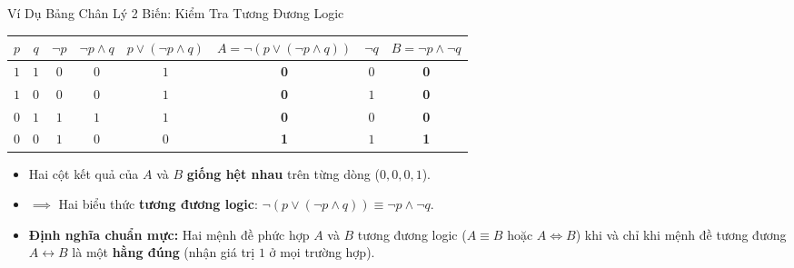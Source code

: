 \documentclass[aspectratio=169, 10pt]{beamer}
\begin{document}
\begin{frame}{Ví Dụ Bảng Chân Lý 2 Biến: Kiểm Tra Tương Đương Logic}
  \begin{cozyExample}[Bài toán: Kiểm tra hai biểu thức $A = \neg(p \lor (\neg p \land q))$ và $B = \neg p \land \neg q$ có tương đương không?]
    \centering
    \renewcommand{\arraystretch}{1.05}
    \footnotesize
    \begin{tabular}{cc|cccc|cc}
      \toprule
      $p$ & $q$ & $\neg p$ & $\neg p \land q$ & $p \lor (\neg p \land q)$ & $A = \neg(p \lor (\neg p \land q))$ & $\neg q$ & $B = \neg p \land \neg q$ \\
      \midrule
      $1$ & $1$ & $0$ & $0$ & $1$ & \textbf{\textcolor{cozyFalse}{0}} & $0$ & \textbf{\textcolor{cozyFalse}{0}} \\
      $1$ & $0$ & $0$ & $0$ & $1$ & \textbf{\textcolor{cozyFalse}{0}} & $1$ & \textbf{\textcolor{cozyFalse}{0}} \\
      $0$ & $1$ & $1$ & $1$ & $1$ & \textbf{\textcolor{cozyFalse}{0}} & $0$ & \textbf{\textcolor{cozyFalse}{0}} \\
      $0$ & $0$ & $1$ & $0$ & $0$ & \textbf{\textcolor{cozyTrue}{1}} & $1$ & \textbf{\textcolor{cozyTrue}{1}} \\
      \bottomrule
    \end{tabular}
  \end{cozyExample}
  \vspace{0.03cm}
  \begin{cozyInsight}
    \small
    \begin{itemize}
      \setlength{\itemsep}{1.5pt}
      \item Hai cột kết quả của \textbf{$A$} và \textbf{$B$} \textbf{giống hệt nhau} trên từng dòng ($0, 0, 0, 1$).
      \item $\implies$ Hai biểu thức \textbf{tương đương logic}: $\neg(p \lor (\neg p \land q)) \equiv \neg p \land \neg q$.
      \item \textbf{Định nghĩa chuẩn mực:} Hai mệnh đề phức hợp $A$ và $B$ tương đương logic ($A \equiv B$ hoặc $A \Leftrightarrow B$) khi và chỉ khi mệnh đề tương đương $A \leftrightarrow B$ là một \textbf{hằng đúng} (nhận giá trị $1$ ở mọi trường hợp).
    \end{itemize}
  \end{cozyInsight}
\end{frame}
\end{document}
